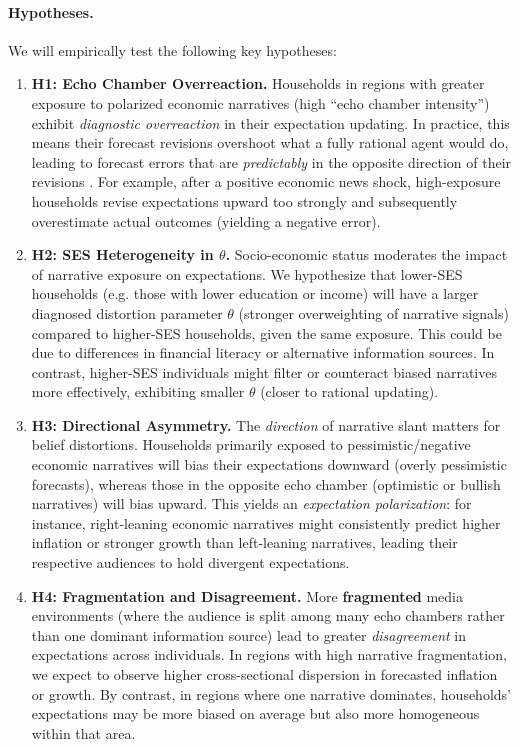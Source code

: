 \documentclass[12pt]{article}
\begin{document}
\paragraph{Hypotheses.} We will empirically test the following key hypotheses:
\begin{enumerate}
    \item \textbf{H1: Echo Chamber Overreaction.} Households in regions with greater exposure to polarized economic narratives (high ``echo chamber intensity'') exhibit \emph{diagnostic overreaction} in their expectation updating. In practice, this means their forecast revisions overshoot what a fully rational agent would do, leading to forecast errors that are \emph{predictably} in the opposite direction of their revisions \citep{GEMMI2026103868}. For example, after a positive economic news shock, high-exposure households revise expectations upward too strongly and subsequently overestimate actual outcomes (yielding a negative error).
    \item \textbf{H2: SES Heterogeneity in $\theta$.} Socio-economic status moderates the impact of narrative exposure on expectations. We hypothesize that lower-SES households (e.g. those with lower education or income) will have a larger diagnosed distortion parameter $\theta$ (stronger overweighting of narrative signals) compared to higher-SES households, given the same exposure. This could be due to differences in financial literacy or alternative information sources. In contrast, higher-SES individuals might filter or counteract biased narratives more effectively, exhibiting smaller $\theta$ (closer to rational updating).
    \item \textbf{H3: Directional Asymmetry.} The \emph{direction} of narrative slant matters for belief distortions. Households primarily exposed to pessimistic/negative economic narratives will bias their expectations downward (overly pessimistic forecasts), whereas those in the opposite echo chamber (optimistic or bullish narratives) will bias upward. This yields an \emph{expectation polarization}: for instance, right-leaning economic narratives might consistently predict higher inflation or stronger growth than left-leaning narratives, leading their respective audiences to hold divergent expectations.
    \item \textbf{H4: Fragmentation and Disagreement.} More \textbf{fragmented} media environments (where the audience is split among many echo chambers rather than one dominant information source) lead to greater \emph{disagreement} in expectations across individuals. In regions with high narrative fragmentation, we expect to observe higher cross-sectional dispersion in forecasted inflation or growth. By contrast, in regions where one narrative dominates, households' expectations may be more biased on average but also more homogeneous within that area.

\end{enumerate}
\end{document}
